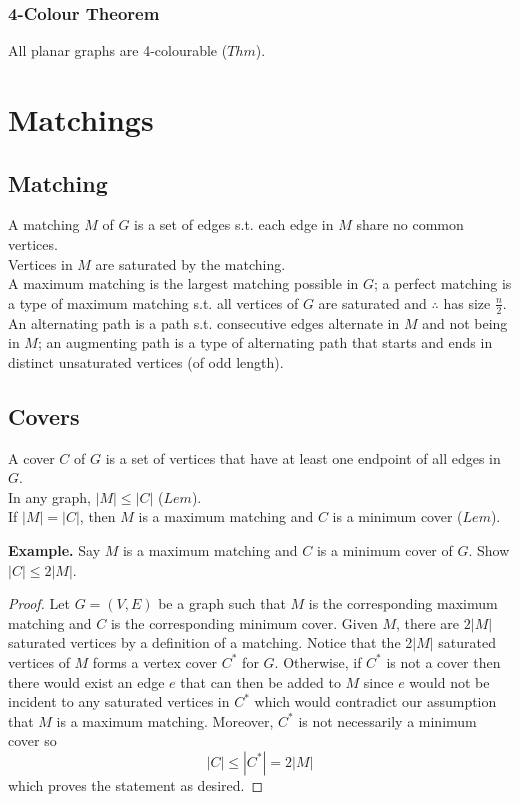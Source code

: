 \documentclass[11pt]{article}
\newenvironment{eg}[1]{
\begin{tcolorbox}[colback = white!15, arc=0pt,outer arc=0pt, colframe = black]
{\color{black} \textbf{Example.} #1} \\[5pt]
}
{
\end{tcolorbox}
}
\newcommand{\nl}{\\[5pt]}
\begin{document}
\subsubsection{4-Colour Theorem}
All planar graphs are 4-colourable ($Thm$).

\newpage
\section{Matchings}
\subsection{Matching}
A matching $M$ of $G$ is a set of edges s.t. each edge in $M$ share no common vertices. \nl 
Vertices in $M$ are saturated by the matching. \nl 
A maximum matching is the largest matching possible in $G$; a perfect matching is a type of maximum matching s.t. all vertices of $G$ are saturated and $\therefore$ has size $\frac{n}{2}$. \nl 
An alternating path is a path s.t. consecutive edges alternate in $M$ and not being in $M$; an augmenting path is a type of alternating path that starts and ends in distinct unsaturated vertices (of odd length).
\subsection{Covers}
A cover $C$ of $G$ is a set of vertices that have at least one endpoint of all edges in $G$. \nl
In any graph, $|M| \leq |C|$ ($Lem$). \nl 
If $|M| = |C|$, then $M$ is a maximum matching and $C$ is a minimum cover ($Lem$).

\begin{eg}{Say $M$ is a maximum matching and $C$ is a minimum cover of $G$.
Show $|C| \leq 2|M |$.}
\vspace{-20pt}
\begin{proof}
Let $G = (V, E)$ be a graph such that $M$ is the corresponding maximum matching and $C$ is the corresponding minimum cover. Given $M$, there are $2|M|$ saturated vertices by a definition of a matching. Notice that the 2$|M|$ saturated vertices of $M$ forms a vertex cover $C^*$ for $G$. Otherwise, if $C^*$ is not a cover then there would exist an edge $e$ that can then be added to $M$ since $e$ would not be incident to any saturated vertices in $C^*$ which would contradict our assumption that $M$ is a maximum matching. Moreover, $C^*$ is not necessarily a minimum cover so 
$$|C| \leq |C^*| = 2|M|$$
which proves the statement as desired.
\end{proof}
\end{eg}
\end{document}
